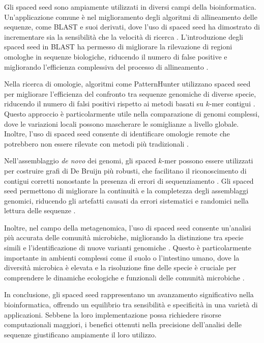 Gli spaced seed sono ampiamente utilizzati in diversi campi della bioinformatica. Un'applicazione comune è nel miglioramento degli algoritmi di allineamento delle sequenze, come BLAST e suoi derivati, dove l'uso di spaced seed ha dimostrato di incrementare sia la sensibilità che la velocità di ricerca \cite{bin2002patternhunter,li2004patternhunter}. L'introduzione degli spaced seed in BLAST ha permesso di migliorare la rilevazione di regioni omologhe in sequenze biologiche, riducendo il numero di false positive e migliorando l'efficienza complessiva del processo di allineamento \cite{camacho2009blast+}.

Nella ricerca di omologie, algoritmi come PatternHunter utilizzano spaced seed per migliorare l'efficienza del confronto tra sequenze genomiche di diverse specie, riducendo il numero di falsi positivi rispetto ai metodi basati su $k$-mer contigui \cite{li2004patternhunter}. Questo approccio è particolarmente utile nella comparazione di genomi complessi, dove le variazioni locali possono mascherare le somiglianze a livello globale. Inoltre, l'uso di spaced seed consente di identificare omologie remote che potrebbero non essere rilevate con metodi più tradizionali \cite{sun2005enhanced}.

Nell'assemblaggio \emph{de novo} dei genomi, gli spaced $k$-mer possono essere utilizzati per costruire grafi di De Bruijn più robusti, che facilitano il riconoscimento di contigui corretti nonostante la presenza di errori di sequenziamento \cite{nagarajan2009parametric}. Gli spaced seed permettono di migliorare la continuità e la completezza degli assemblaggi genomici, riducendo gli artefatti causati da errori sistematici e randomici nella lettura delle sequenze \cite{paten2011genome}.

Inoltre, nel campo della metagenomica, l'uso di spaced seed consente un'analisi più accurata delle comunità microbiche, migliorando la distinzione tra specie simili e l'identificazione di nuove varianti genomiche \cite{burkhardt2006enhanced}. Questo è particolarmente importante in ambienti complessi come il suolo o l'intestino umano, dove la diversità microbica è elevata e la risoluzione fine delle specie è cruciale per comprendere le dinamiche ecologiche e funzionali delle comunità microbiche \cite{turnbaugh2007human}.

In conclusione, gli spaced seed rappresentano un avanzamento significativo nella bioinformatica, offrendo un equilibrio tra sensibilità e specificità in una varietà di applicazioni. Sebbene la loro implementazione possa richiedere risorse computazionali maggiori, i benefici ottenuti nella precisione dell'analisi delle sequenze giustificano ampiamente il loro utilizzo.
